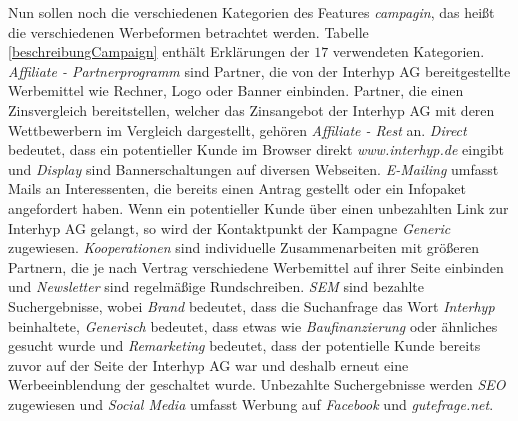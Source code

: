 Nun sollen noch die verschiedenen Kategorien des Features \textit{campagin}, das heißt die verschiedenen Werbeformen betrachtet werden. Tabelle \ref{beschreibungCampaign} enthält Erklärungen der $17$ verwendeten Kategorien.\\
\textit{Affiliate - Partnerprogramm} sind Partner, die von der Interhyp AG bereitgestellte Werbemittel wie Rechner, Logo oder Banner einbinden. Partner, die einen Zinsvergleich bereitstellen, welcher das Zinsangebot der Interhyp AG mit deren Wettbewerbern im Vergleich dargestellt, gehören \textit{Affiliate - Rest} an. \textit{Direct} bedeutet, dass ein potentieller Kunde im Browser direkt \textit{www.interhyp.de} eingibt und \textit{Display} sind Bannerschaltungen auf diversen Webseiten. \textit{E-Mailing} umfasst Mails an Interessenten, die bereits einen Antrag gestellt oder ein Infopaket angefordert haben. Wenn ein potentieller Kunde über einen unbezahlten Link zur Interhyp AG gelangt, so wird der Kontaktpunkt der Kampagne \textit{Generic} zugewiesen. \textit{Kooperationen} sind individuelle Zusammenarbeiten mit größeren Partnern, die je nach Vertrag verschiedene Werbemittel auf ihrer Seite einbinden und \textit{Newsletter} sind regelmäßige Rundschreiben. \textit{SEM} sind bezahlte Suchergebnisse, wobei \textit{Brand} bedeutet, dass die Suchanfrage das Wort \textit{Interhyp} beinhaltete, \textit{Generisch} bedeutet, dass etwas wie \textit{Baufinanzierung} oder ähnliches gesucht wurde und \textit{Remarketing} bedeutet, dass der potentielle Kunde bereits zuvor auf der Seite der Interhyp AG war und deshalb erneut eine Werbeeinblendung der geschaltet wurde. Unbezahlte Suchergebnisse werden \textit{SEO} zugewiesen und \textit{Social Media} umfasst Werbung auf \textit{Facebook} und \textit{gutefrage.net}.
